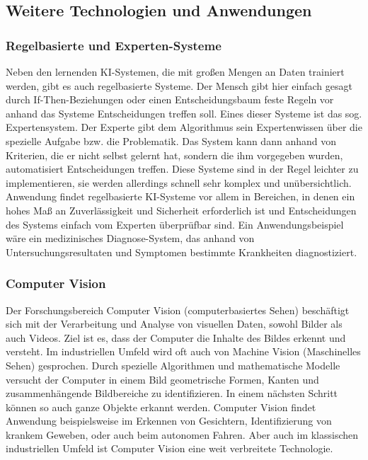 \documentclass[a4paper,12pt, german]{report}
\begin{document}
\subsection{Weitere Technologien und Anwendungen}

\subsubsection{Regelbasierte und Experten-Systeme}

Neben den lernenden KI-Systemen, die mit großen Mengen an Daten trainiert werden, gibt es auch regelbasierte Systeme. Der Mensch gibt hier einfach gesagt durch If-Then-Beziehungen oder einen Entscheidungsbaum feste Regeln vor anhand das Systeme Entscheidungen treffen soll. Eines dieser Systeme ist das sog. Expertensystem. Der Experte gibt dem Algorithmus sein Expertenwissen über die spezielle Aufgabe bzw. die Problematik. Das System kann dann anhand von Kriterien, die er nicht selbst gelernt hat, sondern die ihm vorgegeben wurden, automatisiert Entscheidungen treffen. Diese Systeme sind in der Regel leichter zu implementieren, sie werden allerdings schnell sehr komplex und unübersichtlich.
Anwendung findet regelbasierte KI-Systeme vor allem in Bereichen, in denen ein hohes Maß an Zuverlässigkeit und Sicherheit erforderlich ist und Entscheidungen des Systems einfach vom Experten überprüfbar sind.\cite{14}
Ein Anwendungsbeispiel wäre ein medizinisches Diagnose-System, das anhand von Untersuchungsresultaten und Symptomen bestimmte Krankheiten diagnostiziert.

\subsubsection{Computer Vision} 

Der Forschungsbereich Computer Vision (computerbasiertes Sehen) beschäftigt sich mit der Verarbeitung und Analyse von visuellen Daten, sowohl Bilder als auch Videos. Ziel ist es, dass der Computer die Inhalte des Bildes erkennt und versteht. Im industriellen Umfeld wird oft auch von Machine Vision (Maschinelles Sehen) gesprochen. 
Durch spezielle Algorithmen und mathematische Modelle versucht der Computer in einem Bild geometrische Formen, Kanten und zusammenhängende Bildbereiche zu identifizieren. In einem nächsten Schritt können so auch ganze Objekte erkannt werden. \newline
Computer Vision findet Anwendung beispielsweise im Erkennen von Gesichtern, Identifizierung von krankem Geweben, oder auch beim autonomen Fahren. Aber auch im klassischen industriellen Umfeld ist Computer Vision eine weit verbreitete Technologie.\cite{01}
\end{document}
